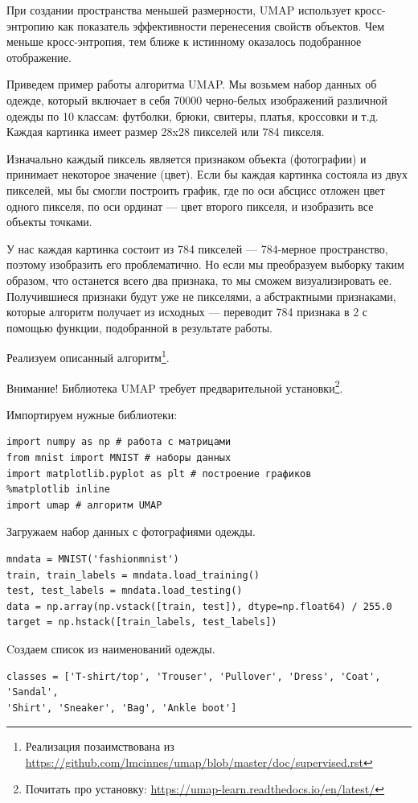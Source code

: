 	При создании пространства меньшей размерности, UMAP использует кросс-энтропию как показатель эффективности перенесения свойств объектов. Чем меньше кросс-энтропия, тем ближе к истинному оказалось подобранное отображение.
	
	Приведем пример работы алгоритма UMAP. Мы возьмем набор данных об одежде, который включает в себя 70000 черно-белых изображений различной одежды по 10 классам: футболки, брюки, свитеры, платья, кроссовки и т.д. Каждая картинка имеет размер 28x28 пикселей или 784 пикселя.
	
	Изначально каждый пиксель является признаком объекта (фотографии) и принимает некоторое значение (цвет). Если бы каждая картинка состояла из двух пикселей, мы бы смогли построить график, где по оси абсцисс отложен цвет одного пикселя, по оси ординат --- цвет второго пикселя, и изобразить все объекты точками.
	
	У нас каждая картинка состоит из 784 пикселей --- 784-мерное пространство, поэтому изобразить его проблематично. Но если мы преобразуем выборку таким образом, что останется всего два признака, то мы сможем визуализировать ее. Получившиеся признаки будут уже не пикселями, а абстрактными признаками, которые алгоритм получает из исходных --- переводит 784 признака в 2 с помощью функции, подобранной в результате работы.
	
	Реализуем описанный алгоритм\footnote{Реализация позаимствована из \url{https://github.com/lmcinnes/umap/blob/master/doc/supervised.rst}}.
	
	Внимание! Библиотека UMAP требует предварительной установки\footnote{Почитать про установку: \url{https://umap-learn.readthedocs.io/en/latest/}}.
	
	Импортируем нужные библиотеки:
	\begin{verbatim}
import numpy as np # работа с матрицами
from mnist import MNIST # наборы данных
import matplotlib.pyplot as plt # построение графиков
%matplotlib inline
import umap # алгоритм UMAP
	\end{verbatim}
	
	Загружаем набор данных с фотографиями одежды.
	\begin{verbatim}
mndata = MNIST('fashionmnist')
train, train_labels = mndata.load_training() 
test, test_labels = mndata.load_testing()
data = np.array(np.vstack([train, test]), dtype=np.float64) / 255.0
target = np.hstack([train_labels, test_labels])
	\end{verbatim}

	Cоздаем список из наименований одежды.
\begin{verbatim}
classes = ['T-shirt/top', 'Trouser', 'Pullover', 'Dress', 'Coat', 'Sandal', 
'Shirt', 'Sneaker', 'Bag', 'Ankle boot']
\end{verbatim}

